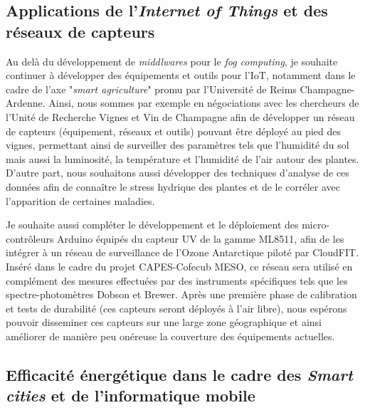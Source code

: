 \subsection*{Applications de l'\textit{Internet of Things} et des réseaux de capteurs}

Au delà du développement de \textit{middlwares} pour le \textit{fog computing}, je souhaite continuer à développer des équipements et outils pour l'IoT, notamment dans le cadre de l'axe "\textit{smart agriculture}" promu par l'Université de Reims Champagne-Ardenne. Ainsi, nous sommes par exemple en négociations avec les chercheurs de l'Unité de Recherche Vignes et Vin de Champagne afin de développer un réseau de capteurs (équipement, réseaux et outils) pouvant être déployé au pied des vignes, permettant ainsi de surveiller des paramètres tels que l'humidité du sol mais aussi la luminosité, la température et l'humidité de l'air autour des plantes. D'autre part, nous souhaitons aussi développer des techniques d'analyse de ces données afin de connaître le stress hydrique des plantes et de le corréler avec l'apparition de certaines maladies. 

Je souhaite aussi compléter le développement et le déploiement des micro-contrôleurs Arduino équipés du capteur UV de la gamme ML8511, afin de les intégrer à un réseau de surveillance de l'Ozone Antarctique piloté par CloudFIT. Inséré dans le cadre du projet CAPES-Cofecub MESO, ce réseau sera utilisé en complément des mesures effectuées par des instruments spécifiques tels que les spectre-photomètres Dobson et Brewer. Après une première phase de calibration et tests de durabilité (ces capteurs seront déployés à l'air libre), nous espérons pouvoir disseminer  ces capteurs sur une large zone géographique et ainsi améliorer de manière peu onéreuse la couverture des équipements actuelles.

\subsection*{Efficacité énergétique dans le cadre des \textit{Smart cities} et de l'informatique mobile}

